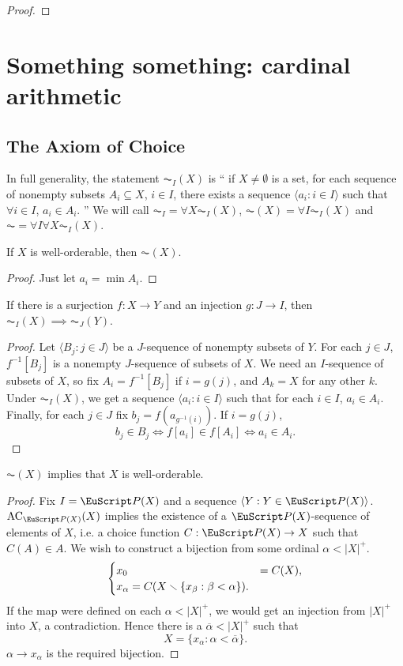 \documentclass[twoside,openright,titlepage,numbers=noenddot,%
               headinclude,footinclude,cleardoublepage=empty,abstract=on,
               BCOR=23mm,paper=letter,fontsize=11pt
               ]{scrreprt}
\begin{document}
\begin{proof}
\end{proof}
\chapter[Cardinal arithmetic]{Something something: cardinal arithmetic}
\section{The Axiom of Choice}
In full generality, the statement $\AC_{I}(X)$ is `` if $X \neq \emptyset$ is a set, for each sequence of nonempty subsets $A_i \subseteq X$, $i \in I$, there exists a sequence $\langle a_i: i \in I \rangle$ such that $\forall i \in I$, $a_i \in A_i$. '' We will call $\AC_{I} = \forall X \AC_{I}(X)$, $\AC(X) = \forall I \AC_{I}(X)$ and $\AC = \forall I \forall X \AC_{I}(X)$.
\begin{lemma}
    If $X$ is well-orderable, then $\AC(X)$.
\end{lemma}
\begin{proof}
    Just let $a_i = \min A_i$.
\end{proof}
\begin{lemma}
    If there is a surjection $f: X \to Y$ and an injection $g: J \to I$, then $\AC_{I}(X) \implies \AC_{J}(Y)$.
\end{lemma}
\begin{proof}
Let $\langle B_j: j \in J \rangle$ be a $J$-sequence of nonempty subsets of $Y$. For each $j \in J$, $f^{-1}[B_j]$ is a nonempty $J$-sequence of subsets of $X$. We need an $I$-sequence of subsets of $X$, so fix $A_i = f^{-1}[B_j]$ if $i = g(j)$, and $A_k = X$ for any other $k$. Under $\AC_{I}(X)$, we get a sequence $\langle a_i: i \in I\rangle$ such that for each $i \in I$, $a_i \in A_i$. Finally, for each $j \in J$ fix $b_j = f(a_{g^{-1}(i)})$. If $i = g(j)$,
\[ b_j \in B_j \iff f[a_{i}] \in f[A_i] \iff a_i \in A_i.\]
\end{proof}
\begin{theorem}
    $\AC(X)$ implies that $X$ is well-orderable.
\end{theorem}
\begin{proof}
    Fix $I = \P(X)$ and a sequence $\langle Y: Y \in \P(X) \rangle$. $\AC_{\P(X)}(X)$ implies the existence of a $\P(X)$-sequence of elements of $X$, i.e. a choice function $C: \P(X) \to X$ such that $C(A) \in A$. We wish to construct a bijection from some ordinal $\alpha < \vert X \vert^+$.
    \begin{equation*}
        \begin{cases}
            x_0 &= C(X), \\
            x_{\alpha} = C(X \smallsetminus \{ x_{\beta}: \beta < \alpha \}).
        \end{cases}
    \end{equation*}
    If the map were defined on each $\alpha < \vert X \vert^+$, we would get an injection from $\vert X \vert^+$ into $X$, a contradiction. Hence there is a $\overline{\alpha} < \vert X \vert^+$ such that
    \[ X = \{ x_\alpha: \alpha < \overline{\alpha} \}. \]
    $\alpha \to x_\alpha$ is the required bijection.
\end{proof}
\end{document}
